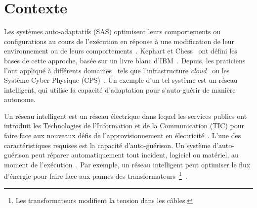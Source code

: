 \section{Contexte}
%
Les systèmes auto-adaptatifs (SAS) optimisent leurs comportements ou configurations au cours de l'exécution en réponse à une modification de leur environnement ou de leurs comportements~\cite{DBLP:conf/dagstuhl/ChengLGIMABBBCSDFGGGKKKLMMMPSTTWW09}. 
Kephart et Chess~\cite{DBLP:journals/computer/KephartC03} ont défini les bases de cette approche, basée sur un livre blanc d'IBM~\cite{computing2006architectural}. 
Depuis, les praticiens l'ont appliqué à différents domaines~\cite{DBLP:journals/corr/abs-1904-01518} tels que l'infrastructure \textit{cloud}~\cite{DBLP:conf/icac/JavadiG17, OpenStack:Watcher:Wiki, DBLP:conf/icse/BarnaKFL17} ou les Système Cyber-Physique (CPS)~\cite{DBLP:conf/icac/LalandaGC17, DBLP:conf/cbse/FouquetMFBPJ12, DBLP:conf/smartgridsec/0001FKNT14}. 
Un exemple d'un tel système est un réseau intelligent, qui utilise la capacité d'adaptation pour s'auto-guérir de manière autonome.

%
Un réseau intelligent est un réseau électrique dans lequel les services publics ont introduit les Technologies de l'Information et de la Communication (TIC) pour faire face aux nouveaux défis de l'approvisionnement en électricité~\cite{farhangi2010path, ipakchi2009grid, DBLP:journals/comsur/FangMXY12}. 
L'une des caractéristiques requises est la capacité d'auto-guérison. 
Un système d'auto-guérison peut réparer automatiquement tout incident, logiciel ou matériel, au moment de l'exécution~\cite{DBLP:journals/computer/KephartC03}.
Par exemple, un réseau intelligent peut optimiser le flux d'énergie pour faire face aux pannes des transformateurs~\footnote{Les transformateurs modifient la tension dans les câbles.}~\cite{DBLP:journals/comsur/FangMXY12}.

